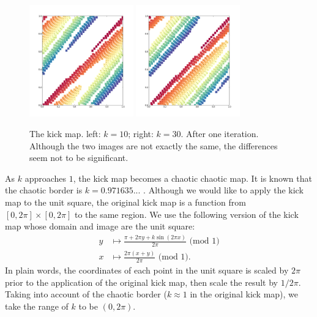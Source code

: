\documentclass[12pt]{reedmcm}
\begin{document}
\begin{figure}[h!]
  \centering
  \includegraphics[width=0.4\textwidth]{kickmap_2pi}
  \hspace{2cm}
  \includegraphics[width=0.4\textwidth]{kickmap_3pi}
  \caption{The kick map. left: $k=10$; right: $k = 30$. After one iteration. 
    Although the two images are not exactly the same, the differences seem not to be significant.
  }
  \label{fig:kickmap_demo2}
\end{figure}
%
As $k$ approaches $1$, the kick map becomes a chaotic chaotic map.
It is known that the chaotic border is $k = 0.971635...$ \citep{spedia}.
Although we would like to apply the kick map to the unit square, the original kick map is a function from $[0,2\pi] \times [0,2\pi]$ to the same region.
We use the following version of the kick map whose domain and image are the unit square:
\begin{align*}
  y &\mapsto \frac{\pi + 2\pi y + k \sin (2\pi x)}{2\pi} \mbox{ (mod 1)}\\
  x &\mapsto \frac{2\pi (x + y)}{2\pi} \mbox{ (mod 1)}.
\end{align*}
In plain words, the coordinates of each point in the unit square is scaled by $2\pi$ prior to the application of the original kick map, then scale the result by $1/2\pi$.
Taking into account of the chaotic border ($k\approx 1$ in the original kick map), we take the range of $k$ to be $(0,2\pi)$.
\end{document}
